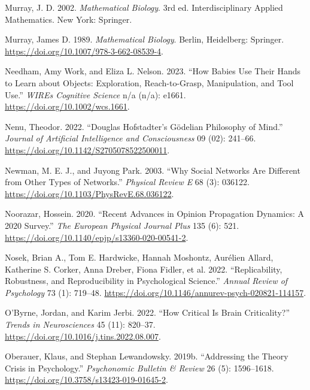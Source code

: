 \documentclass[
  a4paper,
  DIV=11,
  numbers=noendperiod,
  oneside]{scrreprt}
\newlength{\cslhangindent}
\newlength{\cslentryspacingunit} %
\newenvironment{CSLReferences}[2] %
 {%
  \setlength{\parindent}{0pt}
  \ifodd #1
  \let\oldpar\par
  \def\par{\hangindent=\cslhangindent\oldpar}
  \fi
  \setlength{\parskip}{#2\cslentryspacingunit}
 }%
 {}
\begin{document}
\begin{CSLReferences}{1}{0}
\leavevmode{}%
Murray, J. D. 2002. \emph{Mathematical Biology}. 3rd ed.
Interdisciplinary Applied Mathematics. {New York}: {Springer}.

\leavevmode{}%
Murray, James D. 1989. \emph{Mathematical Biology}. Berlin, Heidelberg:
Springer. \url{https://doi.org/10.1007/978-3-662-08539-4}.

\leavevmode{}%
Needham, Amy Work, and Eliza L. Nelson. 2023. {``How Babies Use Their
Hands to Learn about Objects: {Exploration}, Reach-to-Grasp,
Manipulation, and Tool Use.''} \emph{WIREs Cognitive Science} n/a (n/a):
e1661. \url{https://doi.org/10.1002/wcs.1661}.

\leavevmode{}%
Nenu, Theodor. 2022. {``Douglas Hofstadter{'}s Gödelian Philosophy of
Mind.''} \emph{Journal of Artificial Intelligence and Consciousness} 09
(02): 241--66. \url{https://doi.org/10.1142/S2705078522500011}.

\leavevmode{}%
Newman, M. E. J., and Juyong Park. 2003. {``Why Social Networks Are
Different from Other Types of Networks.''} \emph{Physical Review E} 68
(3): 036122. \url{https://doi.org/10.1103/PhysRevE.68.036122}.

\leavevmode{}%
Noorazar, Hossein. 2020. {``Recent Advances in Opinion Propagation
Dynamics: A 2020 Survey.''} \emph{The European Physical Journal Plus}
135 (6): 521. \url{https://doi.org/10.1140/epjp/s13360-020-00541-2}.

\leavevmode{}%
Nosek, Brian A., Tom E. Hardwicke, Hannah Moshontz, Aurélien Allard,
Katherine S. Corker, Anna Dreber, Fiona Fidler, et al. 2022.
{``Replicability, {Robustness}, and {Reproducibility} in {Psychological
Science}.''} \emph{Annual Review of Psychology} 73 (1): 719--48.
\url{https://doi.org/10.1146/annurev-psych-020821-114157}.

\leavevmode{}%
O'Byrne, Jordan, and Karim Jerbi. 2022. {``How Critical Is Brain
Criticality?''} \emph{Trends in Neurosciences} 45 (11): 820--37.
\url{https://doi.org/10.1016/j.tins.2022.08.007}.

\leavevmode{}%
Oberauer, Klaus, and Stephan Lewandowsky. 2019b. {``Addressing the
Theory Crisis in Psychology.''} \emph{Psychonomic Bulletin \& Review} 26
(5): 1596--1618. \url{https://doi.org/10.3758/s13423-019-01645-2}.


\end{CSLReferences}
\end{document}
